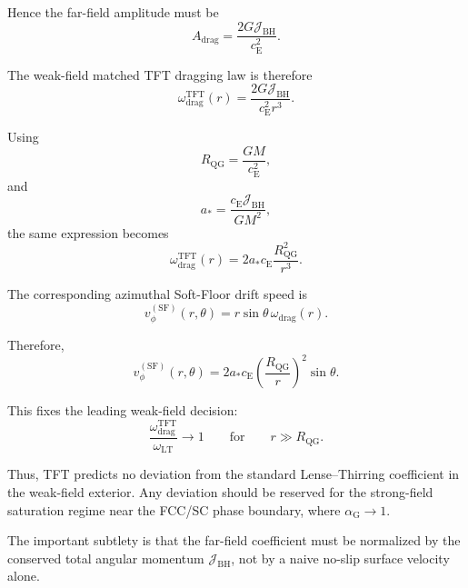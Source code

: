 Hence the far-field amplitude must be
\begin{equation}
    A_{\mathrm{drag}} = \frac{2G\mathcal{J}_{\mathrm{BH}}}{c_{\mathrm{E}}^2}.
\end{equation}

The weak-field matched TFT dragging law is therefore
\begin{equation}
    \boxed{ \omega_{\mathrm{drag}}^{\mathrm{TFT}}(r) = \frac{2G\mathcal{J}_{\mathrm{BH}}}{c_{\mathrm{E}}^2r^3}. }
\end{equation}

Using
\begin{equation}
    R_{\mathrm{QG}} = \frac{GM}{c_{\mathrm{E}}^2},
\end{equation}
and
\begin{equation}
    a_\ast = \frac{c_{\mathrm{E}}\mathcal{J}_{\mathrm{BH}}}{GM^2},
\end{equation}
the same expression becomes
\begin{equation}
    \omega_{\mathrm{drag}}^{\mathrm{TFT}}(r) = 2a_\ast c_{\mathrm{E}} \frac{R_{\mathrm{QG}}^2}{r^3}.
\end{equation}

The corresponding azimuthal Soft-Floor drift speed is
\begin{equation}
    v_{\phi}^{(\mathrm{SF})}(r,\theta) = r\sin\theta \, \omega_{\mathrm{drag}}(r).
\end{equation}

Therefore,
\begin{equation}
    \boxed{ v_{\phi}^{(\mathrm{SF})}(r,\theta) = 2a_\ast c_{\mathrm{E}} \left( \frac{R_{\mathrm{QG}}}{r} \right)^2 \sin\theta. }
\end{equation}

This fixes the leading weak-field decision:
\begin{equation}
    \boxed{ \frac{ \omega_{\mathrm{drag}}^{\mathrm{TFT}} }{ \omega_{\mathrm{LT}} } \rightarrow 1 \qquad \text{for} \qquad r \gg R_{\mathrm{QG}}. }
\end{equation}

Thus, TFT predicts no deviation from the standard Lense--Thirring coefficient in the weak-field exterior. Any deviation should be reserved for the strong-field saturation regime near the FCC/SC phase boundary, where $\alpha_{\mathrm{G}} \rightarrow 1$.

The important subtlety is that the far-field coefficient must be normalized by the conserved total angular momentum $\mathcal{J}_{\mathrm{BH}}$, not by a naive no-slip surface velocity alone.

